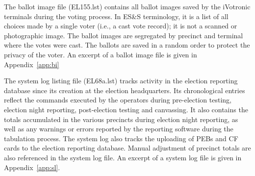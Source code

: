 The ballot image file (EL155.lst) contains all ballot images saved by the iVotronic terminals during the voting process. In ES\&S terminology, it is a list of all choices made by a single voter (i.e., a cast vote record); it is not a scanned or photographic image. The ballot images are segregated by precinct and terminal where the votes were cast. The ballots are saved in a random order to protect the privacy of the voter.  An excerpt of a ballot image file is given in  Appendix~\ref{app:bi}
 
The system log listing file (EL68a.lst) tracks activity in the election reporting database since its creation at the election headquarters. Its chronological entries reflect the commands executed by the operators during  pre-election testing, election night reporting, post-election testing and canvassing. It also contains the totals accumulated in the various precincts during election night reporting, as well as any warnings or errors reported by the reporting software during the tabulation process. The system log also tracks the uploading of PEBs and CF cards to the election reporting database. Manual adjustment of precinct totals are also referenced in the system log file. An excerpt of a system log file is given in Appendix~\ref{app:sl}.
